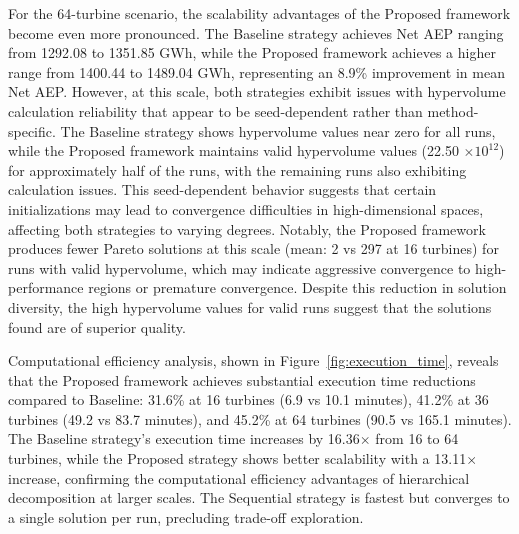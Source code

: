 \documentclass[format=sigconf,anonymous=true,review=true]{acmart}
\begin{document}
For the 64-turbine scenario, the scalability advantages of the Proposed framework become even more pronounced. The Baseline strategy achieves Net AEP ranging from 1292.08 to 1351.85 GWh, while the Proposed framework achieves a higher range from 1400.44 to 1489.04 GWh, representing an 8.9\% improvement in mean Net AEP. However, at this scale, both strategies exhibit issues with hypervolume calculation reliability that appear to be seed-dependent rather than method-specific. The Baseline strategy shows hypervolume values near zero for all runs, while the Proposed framework maintains valid hypervolume values (22.50 $\times 10^{12}$) for approximately half of the runs, with the remaining runs also exhibiting calculation issues. This seed-dependent behavior suggests that certain initializations may lead to convergence difficulties in high-dimensional spaces, affecting both strategies to varying degrees. Notably, the Proposed framework produces fewer Pareto solutions at this scale (mean: 2 vs 297 at 16 turbines) for runs with valid hypervolume, which may indicate aggressive convergence to high-performance regions or premature convergence. Despite this reduction in solution diversity, the high hypervolume values for valid runs suggest that the solutions found are of superior quality.

Computational efficiency analysis, shown in Figure~\ref{fig:execution_time}, reveals that the Proposed framework achieves substantial execution time reductions compared to Baseline: 31.6\% at 16 turbines (6.9 vs 10.1 minutes), 41.2\% at 36 turbines (49.2 vs 83.7 minutes), and 45.2\% at 64 turbines (90.5 vs 165.1 minutes). The Baseline strategy's execution time increases by 16.36$\times$ from 16 to 64 turbines, while the Proposed strategy shows better scalability with a 13.11$\times$ increase, confirming the computational efficiency advantages of hierarchical decomposition at larger scales. The Sequential strategy is fastest but converges to a single solution per run, precluding trade-off exploration.
\end{document}
